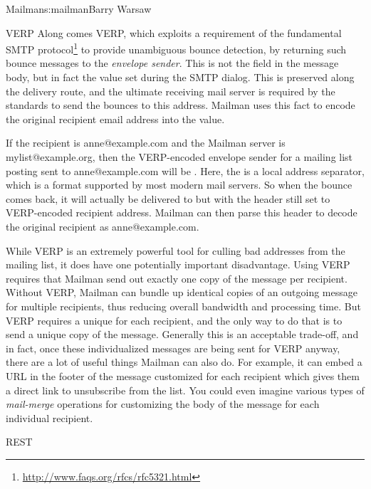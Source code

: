 \begin{aosachapter}{Mailman}{s:mailman}{Barry Warsaw}
\begin{aosasect1}{VERP}
Along comes VERP, which exploits a requirement of the fundamental SMTP
protocol\footnote{\url{http://www.faqs.org/rfcs/rfc5321.html}} to
provide unambiguous bounce detection, by returning such bounce
messages to the \emph{envelope sender}.  This is not the 
field in the message body, but in fact the  value set
during the SMTP dialog.  This is preserved along the delivery route,
and the ultimate receiving mail server is required by the standards to
send the bounces to this address.  Mailman uses this fact to encode
the original recipient email address into the  value.

If the recipient is anne@example.com and the Mailman server is
mylist@example.org, then the VERP-encoded envelope sender for a
mailing list posting sent to anne@example.com will be
.  Here, the \code{+}
is a local address separator, which is a format supported by most
modern mail servers.  So when the bounce comes back, it will actually
be delivered to  but with the
 header still set to VERP-encoded recipient address.
Mailman can then parse this  header to decode the original
recipient as anne@example.com.

While VERP is an extremely powerful tool for culling bad addresses
from the mailing list, it does have one potentially important
disadvantage.  Using VERP requires that Mailman send out exactly one
copy of the message per recipient.  Without VERP, Mailman can bundle
up identical copies of an outgoing message for multiple recipients,
thus reducing overall bandwidth and processing time.  But VERP
requires a unique  for each recipient, and the only
way to do that is to send a unique copy of the message.  Generally
this is an acceptable trade-off, and in fact, once these
individualized messages are being sent for VERP anyway, there are a
lot of useful things Mailman can also do.  For example, it can embed a
URL in the footer of the message customized for each recipient which
gives them a direct link to unsubscribe from the list.  You could even
imagine various types of \emph{mail-merge} operations for customizing
the body of the message for each individual recipient.

\end{aosasect1}

\begin{aosasect1}{REST}


\end{aosasect1}
\end{aosachapter}
